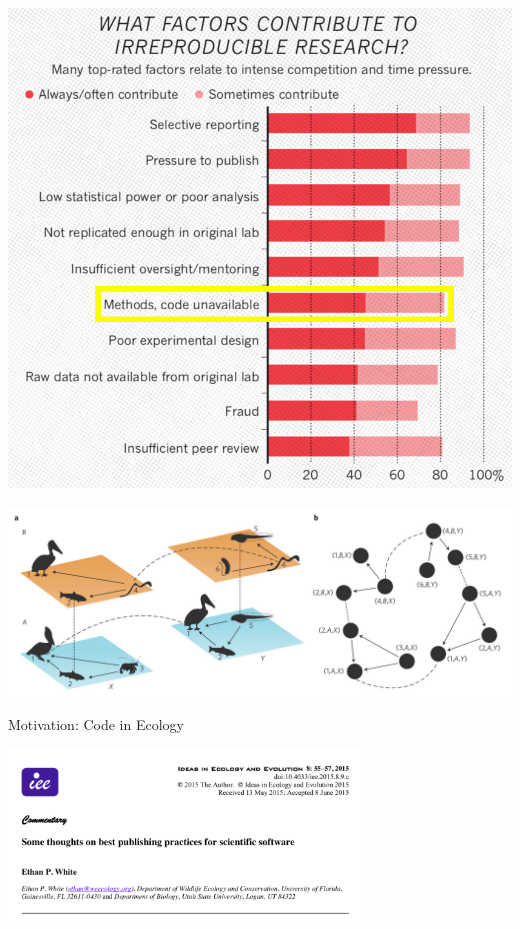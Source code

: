 \documentclass[ignorenonframetext,]{beamer}
\begin{document}
\begin{frame}{}
\protect\hypertarget{section-2}{}

\includegraphics{Baker2016_3.png}

\end{frame}

\begin{frame}{}
\protect\hypertarget{section-3}{}

\includegraphics{pilosof1.png}

\end{frame}

\begin{frame}{Motivation: Code in Ecology}
\protect\hypertarget{motivation-code-in-ecology}{}

\includegraphics[width=0.7\textwidth,height=\textheight]{white2016front.png}

\end{frame}
\end{document}
